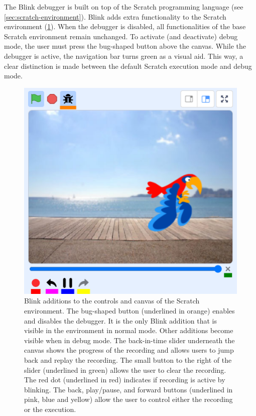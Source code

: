 \documentclass[../main]{subfiles}
\begin{document}
The Blink debugger is built on top of the Scratch programming language (see \cref{sec:scratch-environment}).
Blink adds extra functionality to the Scratch environment (\cref{fig:blink-ide}).
When the debugger is disabled, all functionalities of the base Scratch environment remain unchanged.
To activate (and deactivate) debug mode, the user must press the bug-shaped button above the canvas.
While the debugger is active, the navigation bar turns green as a visual aid.
This way, a clear distinction is made between the default Scratch execution mode and debug mode.

\begin{figure}
    \centering
    \includegraphics[width=\textwidth]{scratch-debugger-ide}
    \caption{
        Blink additions to the controls and canvas of the Scratch environment.
        The bug-shaped button (underlined in orange) enables and disables the debugger.
        It is the only Blink addition that is visible in the environment in normal mode.
        Other additions become visible when in debug mode.
        The back-in-time slider underneath the canvas shows the progress of the recording and allows users to jump back and replay the recording.
        The small button to the right of the slider (underlined in green) allows the user to clear the recording.
        The red dot (underlined in red) indicates if recording is active by blinking.
        The back, play/pause, and forward buttons (underlined in pink, blue and yellow) allow the user to control either the recording or the execution.
    }
    \label{fig:blink-ide}
\end{figure}
\end{document}
